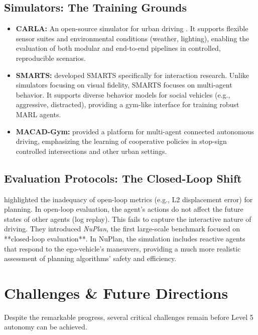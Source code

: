 \documentclass[12pt, a4paper]{article}
\begin{document}
\subsection{Simulators: The Training Grounds}
\begin{itemize}
    \item \textbf{CARLA:} An open-source simulator for urban driving \citep{dosovitskiy17a}. It supports flexible sensor suites and environmental conditions (weather, lighting), enabling the evaluation of both modular and end-to-end pipelines in controlled, reproducible scenarios.
    \item \textbf{SMARTS:} \cite{zhou2020smarts} developed SMARTS specifically for interaction research. Unlike simulators focusing on visual fidelity, SMARTS focuses on multi-agent behavior. It supports diverse behavior models for social vehicles (e.g., aggressive, distracted), providing a gym-like interface for training robust MARL agents.
    \item \textbf{MACAD-Gym:} \cite{palanisamy2020multi} provided a platform for multi-agent connected autonomous driving, emphasizing the learning of cooperative policies in stop-sign controlled intersections and other urban settings.
\end{itemize}

\subsection{Evaluation Protocols: The Closed-Loop Shift}
\cite{caesar2021nuplan} highlighted the inadequacy of open-loop metrics (e.g., L2 displacement error) for planning. In open-loop evaluation, the agent's actions do not affect the future states of other agents (log replay). This fails to capture the interactive nature of driving. They introduced \textit{NuPlan}, the first large-scale benchmark focused on **closed-loop evaluation**. In NuPlan, the simulation includes reactive agents that respond to the ego-vehicle's maneuvers, providing a much more realistic assessment of planning algorithms' safety and efficiency.

\section{Challenges \& Future Directions}
\label{sec:future}

Despite the remarkable progress, several critical challenges remain before Level 5 autonomy can be achieved.
\end{document}

